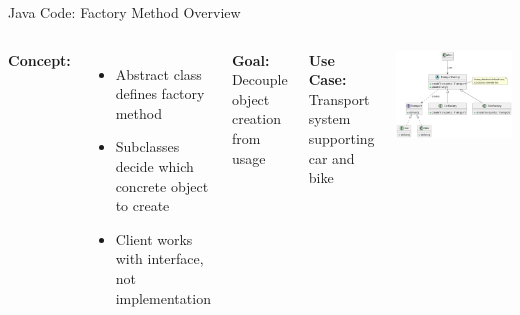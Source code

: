 \documentclass[aspectratio=169, table]{beamer}
\begin{document}
\begin{frame}[fragile]{Java Code: Factory Method Overview}
\vspace{5pt}
\begin{columns}[T]
\textbf{Concept:}
\begin{itemize}
\item Abstract class defines factory method
\item Subclasses decide which concrete object to create
\item Client works with interface, not implementation
\end{itemize}

\textbf{Goal:} Decouple object creation from usage

\vspace{5pt}
\textbf{Use Case:} Transport system supporting car and bike

\includegraphics[width=\linewidth]{../../figures/out/factory_method.png}
\end{columns}
\end{frame}
\end{document}
